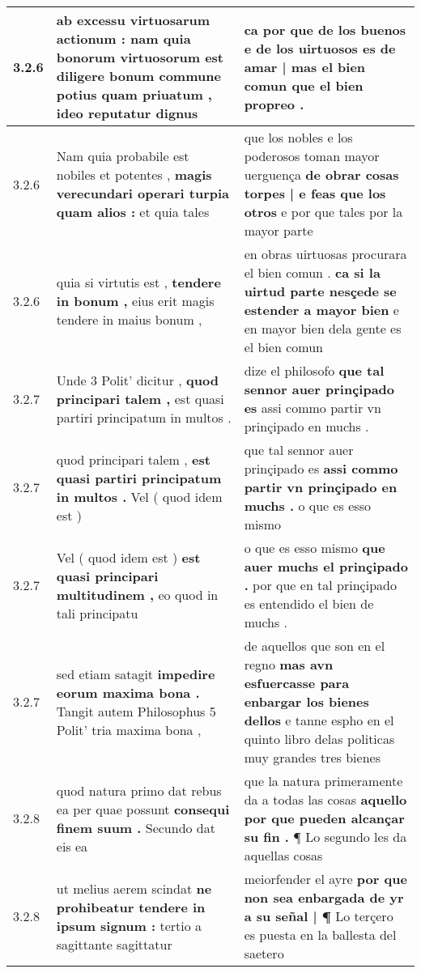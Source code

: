 \begin{tabular}{|p{1cm}|p{6.5cm}|p{6.5cm}|}
3.2.6 & ab excessu virtuosarum actionum : \textbf{ nam quia bonorum virtuosorum est diligere bonum commune potius quam priuatum , } ideo reputatur dignus & ca por que de los buenos \textbf{ e de los uirtuosos es de amar | mas el bien comun } que el bien propreo . \\\hline
3.2.6 & Nam quia probabile est nobiles et potentes , \textbf{ magis verecundari operari turpia quam alios : } et quia tales & que los nobles e los poderosos toman mayor uerguença \textbf{ de obrar cosas torpes | e feas que los otros } e por que tales por la mayor parte \\\hline
3.2.6 & quia si virtutis est , \textbf{ tendere in bonum , } eius erit magis tendere in maius bonum , & en obras uirtuosas procurara el bien comun . \textbf{ ca si la uirtud parte nesçede se estender a mayor bien } e en mayor bien dela gente es el bien comun \\\hline
3.2.7 & Unde 3 Polit’ dicitur , \textbf{ quod principari talem , } est quasi partiri principatum in multos . & dize el philosofo \textbf{ que tal sennor auer prinçipado es } assi commo partir vn prinçipado en muchs . \\\hline
3.2.7 & quod principari talem , \textbf{ est quasi partiri principatum in multos . } Vel ( quod idem est ) & que tal sennor auer prinçipado es \textbf{ assi commo partir vn prinçipado en muchs . } o que es esso mismo \\\hline
3.2.7 & Vel ( quod idem est ) \textbf{ est quasi principari multitudinem , } eo quod in tali principatu & o que es esso mismo \textbf{ que auer muchs el prinçipado . } por que en tal prinçipado es entendido el bien de muchs . \\\hline
3.2.7 & sed etiam satagit \textbf{ impedire eorum maxima bona . } Tangit autem Philosophus 5 Polit’ tria maxima bona , & de aquellos que son en el regno \textbf{ mas avn esfuercasse para enbargar los bienes dellos } e tanne espho en el quinto libro delas politicas muy grandes tres bienes \\\hline
3.2.8 & quod natura primo dat rebus ea per quae possunt \textbf{ consequi finem suum . } Secundo dat eis ea & que la natura primeramente da a todas las cosas \textbf{ aquello por que pueden alcançar su fin . } ¶ Lo segundo les da aquellas cosas \\\hline
3.2.8 & ut melius aerem scindat \textbf{ ne prohibeatur tendere in ipsum signum : } tertio a sagittante sagittatur & meiorfender el ayre \textbf{ por que non sea enbargada de yr a su señal | ¶ } Lo terçero es puesta en la ballesta del saetero \\\hline

\end{tabular}
